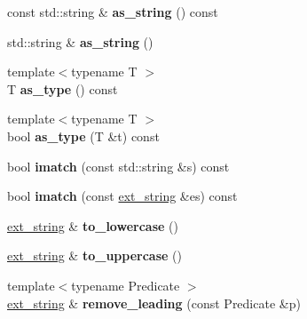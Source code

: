 \begin{DoxyCompactItemize}
\item 
\hypertarget{classstrtk_1_1ext__string_ae7eb1b304c5e2bf1f7fa12c40ab06d88}{const std\-::string \& {\bfseries as\-\_\-string} () const }\label{classstrtk_1_1ext__string_ae7eb1b304c5e2bf1f7fa12c40ab06d88}

\item 
\hypertarget{classstrtk_1_1ext__string_a7cd3caaa8b603e2f8e3b03417b50376a}{std\-::string \& {\bfseries as\-\_\-string} ()}\label{classstrtk_1_1ext__string_a7cd3caaa8b603e2f8e3b03417b50376a}

\item 
\hypertarget{classstrtk_1_1ext__string_adced43a1cf8105d7046fcae82758840c}{{\footnotesize template$<$typename T $>$ }\\T {\bfseries as\-\_\-type} () const }\label{classstrtk_1_1ext__string_adced43a1cf8105d7046fcae82758840c}

\item 
\hypertarget{classstrtk_1_1ext__string_a38ac5f330d997629ce9e78edd1fc3aaf}{{\footnotesize template$<$typename T $>$ }\\bool {\bfseries as\-\_\-type} (T \&t) const }\label{classstrtk_1_1ext__string_a38ac5f330d997629ce9e78edd1fc3aaf}

\item 
\hypertarget{classstrtk_1_1ext__string_af8f018508c982b850dab5bed14e0c568}{bool {\bfseries imatch} (const std\-::string \&s) const }\label{classstrtk_1_1ext__string_af8f018508c982b850dab5bed14e0c568}

\item 
\hypertarget{classstrtk_1_1ext__string_a9e0678312a91f8c73636b7c56661235a}{bool {\bfseries imatch} (const \hyperlink{classstrtk_1_1ext__string}{ext\-\_\-string} \&es) const }\label{classstrtk_1_1ext__string_a9e0678312a91f8c73636b7c56661235a}

\item 
\hypertarget{classstrtk_1_1ext__string_a23574829824c5fe72e489ee8997b0dd7}{\hyperlink{classstrtk_1_1ext__string}{ext\-\_\-string} \& {\bfseries to\-\_\-lowercase} ()}\label{classstrtk_1_1ext__string_a23574829824c5fe72e489ee8997b0dd7}

\item 
\hypertarget{classstrtk_1_1ext__string_a0a96f389dd613c9d062d417897dc1365}{\hyperlink{classstrtk_1_1ext__string}{ext\-\_\-string} \& {\bfseries to\-\_\-uppercase} ()}\label{classstrtk_1_1ext__string_a0a96f389dd613c9d062d417897dc1365}

\item 
\hypertarget{classstrtk_1_1ext__string_a451346adf33e950642197827bb11621b}{{\footnotesize template$<$typename Predicate $>$ }\\\hyperlink{classstrtk_1_1ext__string}{ext\-\_\-string} \& {\bfseries remove\-\_\-leading} (const Predicate \&p)}\label{classstrtk_1_1ext__string_a451346adf33e950642197827bb11621b}


\end{DoxyCompactItemize}
